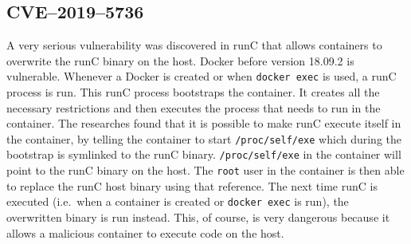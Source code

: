 \subsection{CVE--2019--5736}\label{CVE-2019-5736}
A very serious vulnerability was discovered in runC that allows containers to overwrite the runC binary on the host. Docker before version 18.09.2 is vulnerable. Whenever a Docker is created or when \lstinline{docker exec} is used, a runC process is run. This runC process bootstraps the container. It creates all the necessary restrictions and then executes the process that needs to run in the container. The researches found that it is possible to make runC execute itself in the container, by telling the container to start \lstinline{/proc/self/exe} which during the bootstrap is symlinked to the runC binary\cite{CVE-2019-5736-DragonSector}\cite{CVE-2019-5736-Github}. \lstinline{/proc/self/exe} in the container will point to the runC binary on the host. The \lstinline{root} user in the container is then able to replace the runC host binary using that reference. The next time runC is executed (i.e.\ when a container is created or \lstinline{docker exec} is run), the overwritten binary is run instead. This, of course, is very dangerous because it allows a malicious container to execute code on the host.

